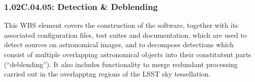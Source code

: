 \subsubsection*{1.02C.04.05: Detection \& Deblending}

This WBS element covers the construction of the software, together with its
associated configuration files, test suites and documentation, which are used
to detect sources on astronomical images, and to decompose detections which
consist of multiple overlapping astronomical objects into their constitutent
parts (``deblending''). It also includes functionality to merge redundant
processing carried out in the overlapptng regions of the LSST sky
tessellation.
